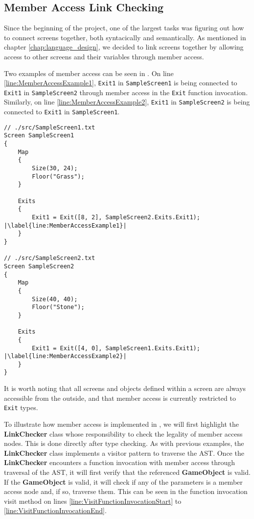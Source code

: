 \subsection*{Member Access Link Checking} \label{sec:Linker}
Since the beginning of the project, one of the largest tasks was figuring out how to connect screens together, both syntacically and semantically. 
As mentioned in chapter \ref{chap:language_design}, we decided to link screens together by allowing access to other screens and their variables through member access. 


Two examples of member access can be seen in . 
On line \ref{line:MemberAccessExample1}, \texttt{Exit1} in \texttt{SampleScreen1} is being connected to \texttt{Exit1} in \texttt{SampleScreen2} through member access in the \texttt{Exit} function invocation.
Similarly, on line \ref{line:MemberAccessExample2}, \texttt{Exit1} in \texttt{SampleScreen2} is being connected to \texttt{Exit1} in \texttt{SampleScreen1}.

\begin{lstlisting}[language=CSharp, caption={\dazel{} source code example of member access.}, label={lst:LinkingExample},escapechar=|]
// ./src/SampleScreen1.txt
Screen SampleScreen1 
{
	Map 
	{
		Size(30, 24);
		Floor("Grass");
	}
	
	Exits 
	{
		Exit1 = Exit([8, 2], SampleScreen2.Exits.Exit1); |\label{line:MemberAccessExample1}|
	}
}

// ./src/SampleScreen2.txt
Screen SampleScreen2
{
	Map 
	{
		Size(40, 40);
		Floor("Stone");
	}
	
	Exits 
	{
		Exit1 = Exit([4, 0], SampleScreen1.Exits.Exit1); |\label{line:MemberAccessExample2}|
	}
}
\end{lstlisting}

It is worth noting that all screens and objects defined within a screen are always accessible from the outside, and that member access is currently restricted to \texttt{Exit} types.


To illustrate how member access is implemented in \dazel{}, we will first highlight the \textbf{LinkChecker} class whose responsibility to check the legality of member access nodes. This is done directly after type checking.
As with previous examples, the \textbf{LinkChecker} class implements a visitor pattern to traverse the AST.
Once the \textbf{LinkChecker} encounters a function invocation with member access through traversal of the AST, it will first verify that the referenced \textbf{GameObject} is valid. 
If the \textbf{GameObject} is valid, it will check if any of the parameters is a member access node and, if so, traverse them. This can be seen in the function invocation visit method on lines \ref{line:VisitFunctionInvocationStart} to \ref{line:VisitFunctionInvocationEnd}. 

